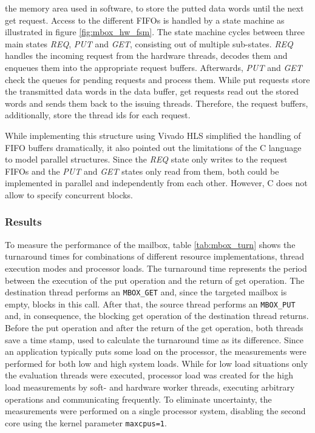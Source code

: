 the memory area used in software, to store the putted data words until the
next get request. Access to the different \acp{FIFO} is handled by a state
machine as illustrated in figure \ref{fig:mbox_hw_fsm}. The state machine
cycles between three main states \emph{REQ}, \emph{PUT} and \emph{GET},
consisting out of multiple sub-states. \emph{REQ} handles the incoming request
from the hardware threads, decodes them and enqueues them into the appropriate
request buffers. Afterwards, \emph{PUT} and \emph{GET} check the queues for
pending requests and process them. While put requests store the transmitted
data words in the data buffer, get requests read out the stored words and
sends them back to the issuing threads. Therefore, the request buffers,
additionally, store the thread ids for each request.

While implementing this structure using Vivado HLS simplified the handling of
\ac{FIFO} buffers dramatically, it also pointed out the limitations of the C
language to model parallel structures. Since the \emph{REQ} state only writes
to the request \acp{FIFO} and the \emph{PUT} and \emph{GET} states only read
from them, both could be implemented in parallel and independently from each
other. However, C does not allow to specify concurrent blocks.

\subsubsection{Results}
To measure the performance of the mailbox, table \ref{tab:mbox_turn} shows the
turnaround times for combinations of different resource implementations,
thread execution modes and processor loads. The turnaround time represents the
period between the execution of the put operation and the return of get
operation. The destination thread performs an \lstinline{MBOX_GET} and, since
the targeted mailbox is empty, blocks in this call. After that, the source
thread performs an \lstinline{MBOX_PUT} and, in consequence, the blocking get
operation of the destination thread returns. Before the put operation and
after the return of the get operation, both threads save a time stamp, used to
calculate the turnaround time as its difference. Since an application
typically puts some load on the processor, the measurements were performed for
both low and high system loads. While for low load situations only the
evaluation threads were executed, processor load was created for the high load
measurements by soft- and hardware worker threads, executing arbitrary
operations and communicating frequently. To eliminate uncertainty, the
measurements were performed on a single processor system, disabling the second
core using the kernel parameter
\lstinline{maxcpus=1}.

